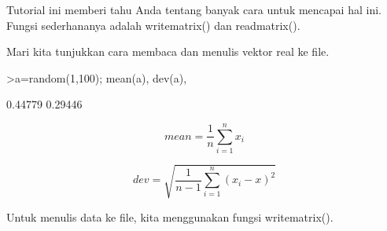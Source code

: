 \documentclass[a4paper,10pt]{article}
\begin{document}
\begin{eulernotebook}
\begin{eulercomment}
\begin{eulercomment}
\begin{eulercomment}
\begin{eulercomment}
\begin{eulercomment}
\begin{eulercomment}
\begin{eulercomment}
\begin{eulercomment}
\begin{eulercomment}
\begin{eulercomment}
\begin{eulercomment}
\begin{eulercomment}
\begin{eulercomment}
\begin{eulercomment}
\begin{eulercomment}
\begin{eulercomment}
\begin{eulercomment}
Tutorial ini memberi tahu Anda tentang banyak cara untuk mencapai hal
ini. Fungsi sederhananya adalah writematrix() dan readmatrix().

Mari kita tunjukkan cara membaca dan menulis vektor real ke file.
\end{eulercomment}
\begin{eulerprompt}
>a=random(1,100); mean(a), dev(a),
\end{eulerprompt}
\begin{euleroutput}
  0.44779
  0.29446
\end{euleroutput}
\begin{eulerformula}
\[
mean= \frac{1}{n} \sum_{i=1}^n x_i
\]
\end{eulerformula}
\begin{eulerformula}
\[
dev= \sqrt{\frac{1}{n-1}\sum_{i=1}^n(x_i-x)^2}
\]
\end{eulerformula}
\begin{eulercomment}
Untuk menulis data ke file, kita menggunakan fungsi writematrix().


\end{eulercomment}
\end{eulercomment}
\end{eulercomment}
\end{eulercomment}
\end{eulercomment}
\end{eulercomment}
\end{eulercomment}
\end{eulercomment}
\end{eulercomment}
\end{eulercomment}
\end{eulercomment}
\end{eulercomment}
\end{eulercomment}
\end{eulercomment}
\end{eulercomment}
\end{eulercomment}
\end{eulercomment}
\end{eulernotebook}
\end{document}
